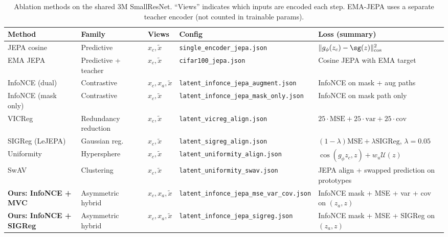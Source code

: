 \begin{table}[t]
  \centering
  \caption{Ablation methods on the shared 3M SmallResNet.
  ``Views'' indicates which inputs are encoded each step.
  EMA-JEPA uses a separate teacher encoder (not counted in trainable params).}
  \label{tab:ablation-methods}
  \small
  \begin{tabular}{llllp{5.8cm}}
    \toprule
    Method & Family & Views & Config & Loss (summary) \\
    \midrule
    JEPA cosine & Predictive~\cite{assran2023ijepa}
      & $x_c, \tilde{x}$
      & \texttt{single\_encoder\_jepa.json}
      & $\|g_\phi(z_c) - \sg(z)\|^2_{\cos}$ \\
    EMA JEPA & Predictive + teacher
      & $x_c, \tilde{x}$
      & \texttt{cifar100\_jepa.json}
      & Cosine JEPA with EMA target \\
    InfoNCE (dual) & Contrastive~\cite{chen2020simclr}
      & $x_c, x_a, \tilde{x}$
      & \texttt{latent\_infonce\_jepa\_augment.json}
      & InfoNCE on mask + aug paths \\
    InfoNCE (mask only) & Contrastive
      & $x_c, \tilde{x}$
      & \texttt{latent\_infonce\_jepa\_mask\_only.json}
      & InfoNCE on mask path only \\
    VICReg & Redundancy reduction~\cite{bardes2022vicreg}
      & $x_c, \tilde{x}$
      & \texttt{latent\_vicreg\_align.json}
      & $25{\cdot}\mathrm{MSE} + 25{\cdot}\mathrm{var} + 25{\cdot}\mathrm{cov}$ \\
    SIGReg (LeJEPA) & Gaussian reg.~\cite{balestriero2025lejepa}
      & $x_c, \tilde{x}$
      & \texttt{latent\_sigreg\_align.json}
      & $(1{-}\lambda)\mathrm{MSE} + \lambda\mathrm{SIGReg}$, $\lambda{=}0.05$ \\
    Uniformity & Hypersphere~\cite{wang2022uniformity}
      & $x_c, \tilde{x}$
      & \texttt{latent\_uniformity\_align.json}
      & $\cos(g_\phi z_c, z) + w_u \mathcal{U}(z)$ \\
    SwAV & Clustering~\cite{caron2020swav}
      & $x_c, \tilde{x}$
      & \texttt{latent\_uniformity\_swav.json}
      & JEPA align + swapped prediction on prototypes \\
    \midrule
    \textbf{Ours: InfoNCE + MVC} & Asymmetric hybrid
      & $x_c, x_a, \tilde{x}$
      & \texttt{latent\_infonce\_jepa\_mse\_var\_cov.json}
      & InfoNCE mask + MSE + var + cov on $(z_a, z)$ \\
    \textbf{Ours: InfoNCE + SIGReg} & Asymmetric hybrid
      & $x_c, x_a, \tilde{x}$
      & \texttt{latent\_infonce\_jepa\_sigreg.json}
      & InfoNCE mask + MSE + SIGReg on $(z_a, z)$ \\
    \bottomrule
  \end{tabular}
\end{table}

